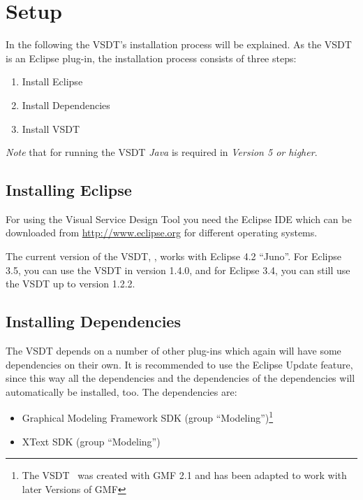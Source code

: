 \chapter{Setup}
\label{sec:user_setup}

In the following the VSDT's installation process will be explained.  As the VSDT
is an Eclipse plug-in, the installation process consists of three steps:
\begin{enumerate}
	\item Install Eclipse
	\item Install Dependencies
	\item Install VSDT
\end{enumerate}

\emph{Note} that for running the VSDT \emph{Java} is required in \emph{Version 5
or higher}.



\section{Installing Eclipse}

For using the Visual Service Design Tool you need the Eclipse IDE which can be
downloaded from \url{http://www.eclipse.org} for different operating systems.

The current version of the VSDT, \version, works with Eclipse 4.2 ``Juno''.
For Eclipse 3.5, you can use the VSDT in version 1.4.0, and for Eclipse 3.4, you
can still use the VSDT up to version 1.2.2.





\section{Installing Dependencies}

The VSDT depends on a number of other plug-ins which again will have some
dependencies on their own.  It is recommended to use the Eclipse Update feature,
since this way all the dependencies and the dependencies of the dependencies
will automatically be installed, too.  The dependencies are:

\begin{itemize}
	\item Graphical Modeling Framework SDK (group ``Modeling'')\footnote{The VSDT
	\version\ was created with GMF 2.1 and has been adapted to work with later
	Versions of GMF}

	\item XText SDK (group ``Modeling'')
\end{itemize}

